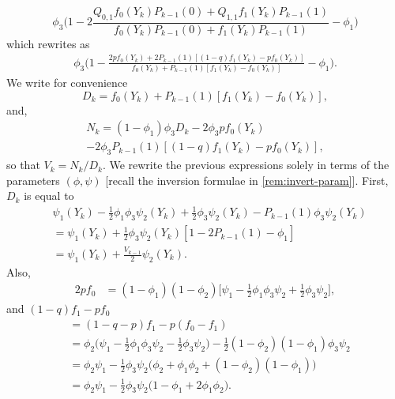 \documentclass[journal]{IEEEtran}
\newcommand{\1}{\boldsymbol{1}}
\begin{document}
  \begin{equation*}
    \phi_3\Big(1
   - 2\frac{Q_{0,1} f_0(Y_k)P_{k-1}(0) + Q_{1,1}f_1(Y_k)P_{k-1}(1)}{f_0(Y_k)P_{k-1}(0) + f_1(Y_k)P_{k-1}(1)} - \phi_1\Big)
 \end{equation*}
 which rewrites as
  \begin{align*}
	 \phi_3\Big(1 - \frac{2pf_{0}(Y_k) + 2P_{k-1}(1)[(1-q)f_1(Y_k) - pf_0(Y_k) ]}{f_0(Y_k) + P_{k-1}(1)[f_1(Y_k) - f_0(Y_k)]} - \phi_1\Big).%
  \end{align*}
  We write for convenience
  \begin{equation*}
  	D_k%
	= f_0(Y_k) + P_{k-1}(1)[f_1(Y_k) - f_0(Y_k)],
  \end{equation*}
  and,
  \begin{multline*}
    N_k
    = (1 - \phi_1)\phi_3D_k - 2\phi_3pf_{0}(Y_k)\\
    - 2\phi_3P_{k-1}(1)[(1-q)f_1(Y_k) - pf_0(Y_k) ],
  \end{multline*}
  so that $V_k = N_k/D_k$. We rewrite the previous expressions solely in terms of the parameters $(\phi,\psi)$ [recall the inversion formulae in \cref{rem:invert-param}].
  First, $D_k$ is equal to
  \begin{align*}
	&\psi_1(Y_k) - \frac{1}{2}\phi_1\phi_3\psi_2(Y_k) + \frac{1}{2}\phi_3\psi_2(Y_k)%
   - P_{k-1}(1) \phi_3\psi_2(Y_k)\\
	&= \psi_1(Y_k) + \frac{1}{2}\phi_3\psi_2(Y_k)[1 - 2 P_{k-1}(1)  - \phi_1  ]\\
	&= \psi_1(Y_k) + \frac{V_{k-1}}{2} \psi_2(Y_k).
  \end{align*}
  Also,
  \begin{align*}
	2p f_0%
	&= (1 - \phi_1)(1 - \phi_2)\Big[\psi_1 - \frac{1}{2}\phi_1\phi_3\psi_2 + \frac{1}{2}\phi_3\psi_2 \Big],%
  \end{align*}
  and $(1-q)f_1 - pf_0$
  \begin{align*}
	&= (1 - q - p)f_1 - p(f_0 - f_1)\\
	&= \phi_2\Big(\psi_1 - \frac{1}{2}\phi_1\phi_3\psi_2 - \frac{1}{2}\phi_3\psi_2   \Big)%
   - \frac{1}{2}(1 - \phi_2)(1 - \phi_1)\phi_3\psi_2\\
	&= \phi_2 \psi_1 - \frac{1}{2}\phi_3\psi_2\Big(\phi_2 + \phi_1\phi_2 + (1-\phi_2)(1-\phi_1) \Big)\\
	&= \phi_2\psi_1 - \frac{1}{2}\phi_3\psi_2\Big(1 - \phi_1 + 2\phi_1\phi_2\Big).
  \end{align*}
\end{document}
